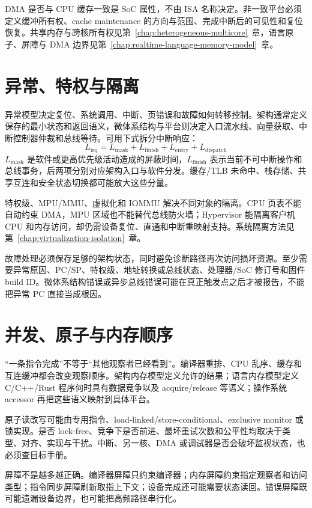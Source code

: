 DMA 是否与 CPU 缓存一致是 SoC 属性，不由 ISA 名称决定。非一致平台必须定义缓冲所有权、cache maintenance 的方向与范围、完成中断后的可见性和复位恢复。共享内存与跨核所有权见第~\ref{chap:heterogeneous-multicore}~章，语言原子、屏障与 DMA 边界见第~\ref{chap:realtime-language-memory-model}~章。

\section{异常、特权与隔离}

异常模型决定复位、系统调用、中断、页错误和故障如何转移控制。架构通常定义保存的最小状态和返回语义，微体系结构与平台则决定入口流水线、向量获取、中断控制器仲裁和总线等待。可用下式拆分中断响应：
\begin{equation}
  L_{\mathrm{irq}} = L_{\mathrm{mask}} + L_{\mathrm{finish}} + L_{\mathrm{entry}} + L_{\mathrm{dispatch}}
\end{equation}
$L_{\mathrm{mask}}$ 是软件或更高优先级活动造成的屏蔽时间，$L_{\mathrm{finish}}$ 表示当前不可中断操作和总线事务，后两项分别对应架构入口与软件分发。缓存/TLB 未命中、栈存储、共享互连和安全状态切换都可能放大这些分量。

特权级、MPU/MMU、虚拟化和 IOMMU 解决不同对象的隔离。CPU 页表不能自动约束 DMA，MPU 区域也不能替代总线防火墙；Hypervisor 能隔离客户机 CPU 和内存访问，却仍需设备复位、直通和中断重映射支持。系统隔离方法见第~\ref{chap:virtualization-isolation}~章。

故障处理必须保存足够的架构状态，同时避免诊断路径再次访问损坏资源。至少需要异常原因、PC/SP、特权级、地址转换或总线状态、处理器/SoC 修订号和固件 build ID。微体系结构错误或异步总线错误可能在真正触发点之后才被报告，不能把异常 PC 直接当成根因。

\section{并发、原子与内存顺序}

“一条指令完成”不等于“其他观察者已经看到”。编译器重排、CPU 乱序、缓存和互连缓冲都会改变观察顺序。架构内存模型定义允许的结果；语言内存模型定义 C/C++/Rust 程序何时具有数据竞争以及 acquire/release 等语义；操作系统 accessor 再把这些语义映射到具体平台。

原子读改写可能由专用指令、load-linked/store-conditional、exclusive monitor 或锁实现。是否 lock-free、竞争下是否前进、最坏重试次数和公平性均取决于类型、对齐、实现与干扰。中断、另一核、DMA 或调试器是否会破坏监视状态，也必须查目标手册。

屏障不是越多越正确。编译器屏障只约束编译器；内存屏障约束指定观察者和访问类型；指令同步屏障刷新取指上下文；设备完成还可能需要状态读回。错误屏障既可能遗漏设备边界，也可能把高频路径串行化。


